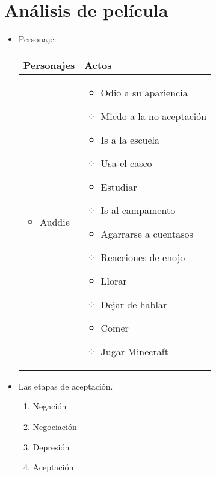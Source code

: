 \section{Análisis de película}
\begin{itemize}
    \item Personaje:
        \begin{center}
           \begin{tabular}{ | p{5cm} | p{5cm} | }
               \hline
                    Personajes & Actos   \\
               \hline
                    \begin{itemize}
                        \item Auddie 
                    \end{itemize}
                    & 
                    \begin{itemize}
                        \item Odio a su apariencia 
                        \item Miedo a la no aceptación 
                        \item Is a la escuela 
                        \item Usa el casco 
                        \item Estudiar 
                        \item Is al campamento 
                        \item Agarrarse a cuentasos 
                        \item Reacciones de enojo 
                        \item Llorar 
                        \item Dejar de hablar 
                        \item Comer 
                        \item Jugar Minecraft 
                    \end{itemize} \\ 
               \hline
           \end{tabular}
        \end{center}
    
    \item Las etapas de aceptación.
        \begin{enumerate}
            \item Negación 
            \item Negociación 
            \item Depresión 
            \item Aceptación 
        \end{enumerate}
    

\end{itemize}
